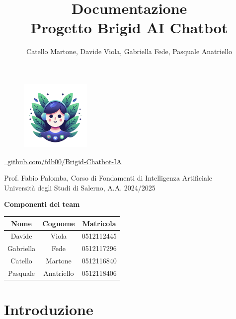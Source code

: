 \documentclass[12pt, letterpaper]{article}
\title{\Huge \textbf{Documentazione}\\[0.5cm]
\Large \textbf{Progetto Brigid AI Chatbot}}
\author{\large Catello Martone, Davide Viola, Gabriella Fede, Pasquale Anatriello}
\begin{document}
	
\begin{figure}[t]
\centering
\includegraphics[width=0.3\textwidth]{immagini/brigid.png}
\end{figure}
	
\maketitle
\begin{center}
\href{https://github.com/fdb00/Brigid-Chatbot-IA}{\scalebox{0.9}{\faGithub}~github.com/fdb00/Brigid-Chatbot-IA}
\end{center}

\vfill
\begin{center}
Prof. Fabio Palomba, Corso di Fondamenti di Intelligenza Artificiale\\
Università degli Studi di Salerno, A.A. 2024/2025
\end{center}
	
	
\newpage
{\Large \textbf{Componenti del team}}
\begin{table}[h]
	\centering
	\large %
	\begin{tabular}{|c|c|c|}
		\hline
		\textbf{Nome} & \textbf{Cognome} & \textbf{Matricola} \\
		\hline
		Davide  & Viola      & 0512112445 \\
		Gabriella & Fede      & 0512117296 \\
		Catello  & Martone    & 0512116840 \\
		Pasquale & Anatriello & 0512118406 \\
		\hline
	\end{tabular}
	\label{tab:studenti}
\end{table}
\newpage
\tableofcontents
\newpage


	
\section{Introduzione}
	
\end{document}
